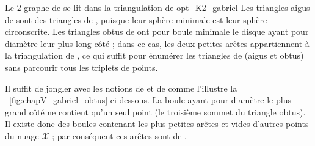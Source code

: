 \begin{Fait}{Le $2$-graphe de  se lit dans la triangulation de  \cite{BibiAppliedNetworkScience}}{opt_K2_gabriel}
Les triangles aigus de  sont des triangles de , puisque leur sphère minimale est leur sphère circonscrite. Les triangles obtus de  ont pour boule minimale le disque ayant pour diamètre leur plus long côté ; dans ce cas, les deux petites arêtes appartiennent à la triangulation de , ce qui suffit pour énumérer les triangles de  (aigus et obtus) sans parcourir tous les triplets de points.
\end{Fait}
\begin{Preuve}
Il suffit de jongler avec les notions de  et de  comme l'illustre la \Fig~\ref{fig:chapV_gabriel_obtus} ci-dessous. 
La boule ayant pour diamètre le plus grand côté ne contient qu'un seul point (le troisième sommet du triangle obtus). Il existe donc des boules contenant les plus petites arêtes et vides d'autres points du nuage $\mathcal X$ ; par conséquent ces arêtes sont de .



\end{Preuve}

